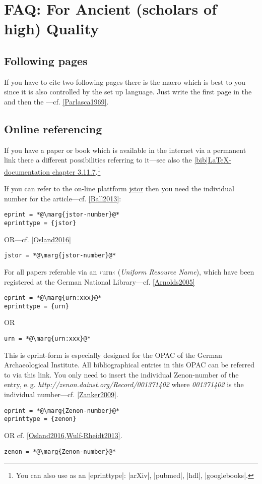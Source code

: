 \documentclass[a4paper,
10pt,
greek,
french,
spanish,
italian,
ngerman,
english
]{ltxdoc}
\begin{document}
\section{FAQ: For  Ancient (scholars of high) Quality}
\subsection{Following pages}
\DescribeMacro{\psq} If you have to cite two following pages there is the macro  which is best to you since it is also controlled by the set up language.
Just write the first page in the  and then the ---cf. \cref{Parlasca1969}.

\subsection{Online referencing}
 If you have a paper or book which is available 
in the internet via a permanent link there a different possibilities referring to it---see also the
 \href{http://tug.ctan.org/macros/latex/exptl/biblatex/doc/biblatex.pdf}{|bib|\LaTeX-documentation chapter 3.11.7}.\footnote{You can also use as an |eprinttype|: |arXiv|, |pubmed|, |hdl|, |googlebooks|.
}

 If you can refer to the on-line plattform \href{www.jstor.org}{jstor} then you need the individual number for the article---cf. \cref{Ball2013}:
\begin{lstlisting}
eprint = *@\marg{jstor-number}@*
eprinttype = {jstor} 
\end{lstlisting}			
OR---cf. \cref{Osland2016}
\begin{lstlisting}
jstor = *@\marg{jstor-number}@*
\end{lstlisting}	

For all papers referable via an ›urn‹ (\emph{Uniform Resource Name}), which have been registered at the German National Library---cf. \cref{Arnolds2005}
\begin{lstlisting}
eprint = *@\marg{urn:xxx}@*
eprinttype = {urn} 
\end{lstlisting}			

OR
\begin{lstlisting}
urn = *@\marg{urn:xxx}@*
\end{lstlisting}	

This is eprint-form is especially designed for the OPAC of the German Archaeological Institute.
All bibliographical entries in this OPAC can be referred to via this link.
You only need to insert the individual Zenon-number of the entry, e.\,g. \emph{http://zenon.dainst.org/Record/001371402} where \emph{001371402} is the individual number---cf. \cref{Zanker2009}.
\begin{lstlisting}
eprint = *@\marg{Zenon-number}@*
eprinttype = {zenon} 
\end{lstlisting}			
OR  cf. \cref{Osland2016,Wulf-Rheidt2013}.
\begin{lstlisting}
zenon = *@\marg{Zenon-number}@*
\end{lstlisting}			
\end{document}
